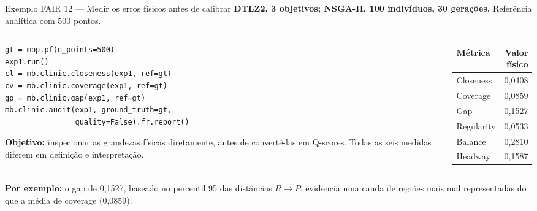 \begin{frame}[fragile]{Exemplo FAIR 12 — Medir os erros físicos antes de calibrar}
\textbf{DTLZ2, 3 objetivos; NSGA-II, 100 indivíduos, 30 gerações.} Referência analítica com 500 pontos.
\begin{columns}[T,onlytextwidth]
\begin{column}{.54\textwidth}
\begin{lstlisting}[style=python,basicstyle=\ttfamily\fontsize{7.5}{9.1}\selectfont]
gt = mop.pf(n_points=500)
exp1.run()
cl = mb.clinic.closeness(exp1, ref=gt)
cv = mb.clinic.coverage(exp1, ref=gt)
gp = mb.clinic.gap(exp1, ref=gt)
mb.clinic.audit(exp1, ground_truth=gt,
                quality=False).fr.report()
\end{lstlisting}
\textbf{Objetivo:} inspecionar as grandezas físicas diretamente, antes de convertê-las em Q-scores. Todas as seis medidas diferem em definição e interpretação.
\end{column}
\begin{column}{.43\textwidth}\centering
\renewcommand{\arraystretch}{1.20}
\begin{tabular}{@{}lr@{}}
\textbf{Métrica} & \textbf{Valor físico}\\\hline
Closeness & 0,0408\\
Coverage & 0,0859\\
Gap & 0,1527\\
Regularity & 0,0533\\
Balance & 0,2810\\
Headway & 0,1587\\
\end{tabular}
\end{column}
\end{columns}
\vspace{.11cm}
\textbf{Por exemplo:} o gap de 0,1527, baseado no percentil 95 das distâncias $R\to P$, evidencia uma cauda de regiões mais mal representadas do que a média de coverage (0,0859).
\end{frame}

